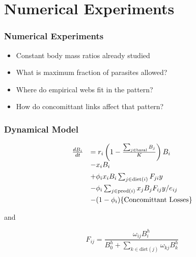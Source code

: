 \documentclass{beamer}
\begin{document}
\section{Numerical Experiments}

\begin{frame}
\frametitle{Numerical Experiments}
\begin{itemize}[<+->]
\item Constant body mass ratios already studied
\item What is maximum fraction of parasites allowed?
\item Where do empirical webs fit in the pattern?
\item How do concomittant links affect that pattern?
\end{itemize}
\end{frame}

\begin{frame}
\frametitle{Dynamical Model}
\begin{equation}\label{eq:ATNAAAI}
\begin{array}{r l}
\frac{dB_{i}}{dt} &= r_{i}\left(1-\frac{\sum_{j\in \text{basal}}B_{j}}{K}\right)B_{i}\\[1ex]
& - x_{i}B_{i}\\[1ex]
& + \phi_ix_{i}B_{i}\sum_{j \in \text{diet}(i)}F_{ji}y\\[1ex]
&- \phi_i\sum_{j \in \text{pred}(i)}x_{j}B_{j}F_{ij}y/e_{ij} \\[1ex]
&-(1-\phi_i)\{\text{Concomittant Losses}\}
\end{array}
\end{equation}

and

\begin{equation}\label{eq:FRAAAI}
F_{ij} = \frac{\omega_{ij}B_{i}^{h}}{B_{0}^{h}+ \sum_{k\in \text{diet}(j)}\omega_{kj}B_{k}^{h}}
\end{equation}
\end{frame}
\end{document}
